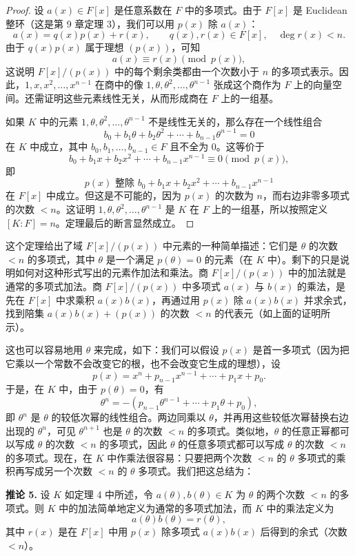 \begin{proof}
	设 $a(x)\in F[x]$ 是任意系数在 $F$ 中的多项式。由于 $F[x]$ 是 Euclidean 整环（这是第 9 章定理 3），我们可以用 $p(x)$ 除 $a(x)$：
	\[
	a(x)=q(x)p(x)+r(x),\qquad q(x),r(x)\in F[x],\quad \deg r(x)<n.
	\]
	由于 $q(x)p(x)$ 属于理想 $(p(x))$，可知
	\[
	a(x)\equiv r(x)\pmod{p(x)},
	\]
	这说明 $F[x]/(p(x))$ 中的每个剩余类都由一个次数小于 $n$ 的多项式表示。因此，$1,x,x^2,\ldots,x^{n-1}$ 在商中的像 $1,\theta,\theta^2,\ldots,\theta^{n-1}$ 张成这个商作为 $F$ 上的向量空间。还需证明这些元素线性无关，从而形成商在 $F$ 上的一组基。
	
	如果 $K$ 中的元素 $1,\theta,\theta^2,\ldots,\theta^{n-1}$ 不是线性无关的，那么存在一个线性组合
	\[
	b_0+b_1\theta+b_2\theta^2+\cdots+b_{n-1}\theta^{n-1}=0
	\]
	在 $K$ 中成立，其中 $b_0,b_1,\ldots,b_{n-1}\in F$ 且不全为 $0$。这等价于
	\[
	b_0+b_1x+b_2x^2+\cdots+b_{n-1}x^{n-1}\equiv 0\pmod{p(x)},
	\]
	即
	\[
	p(x)\text{ 整除 } b_0+b_1x+b_2x^2+\cdots+b_{n-1}x^{n-1}
	\]
	在 $F[x]$ 中成立。但这是不可能的，因为 $p(x)$ 的次数为 $n$，而右边非零多项式的次数 $<n$。这证明 $1,\theta,\theta^2,\ldots,\theta^{n-1}$ 是 $K$ 在 $F$ 上的一组基，所以按照定义 $[K:F]=n$。定理最后的断言显然成立。
\end{proof}

这个定理给出了域 $F[x]/(p(x))$ 中元素的一种简单描述：它们是 $\theta$ 的次数 $<n$ 的多项式，其中 $\theta$ 是一个满足 $p(\theta)=0$ 的元素（在 $K$ 中）。剩下的只是说明如何对这种形式写出的元素作加法和乘法。商 $F[x]/(p(x))$ 中的加法就是通常的多项式加法。商 $F[x]/(p(x))$ 中多项式 $a(x)$ 与 $b(x)$ 的乘法，是先在 $F[x]$ 中求乘积 $a(x)b(x)$，再通过用 $p(x)$ 除 $a(x)b(x)$ 并求余式，找到陪集 $a(x)b(x)+(p(x))$ 的次数 $<n$ 的代表元（如上面的证明所示）。

这也可以容易地用 $\theta$ 来完成，如下：我们可以假设 $p(x)$ 是首一多项式（因为把它乘以一个常数不会改变它的根，也不会改变它生成的理想），设
\[
p(x)=x^n+p_{n-1}x^{n-1}+\cdots+p_1x+p_0.
\]
于是，在 $K$ 中，由于 $p(\theta)=0$，有
\[
\theta^n=-(p_{n-1}\theta^{n-1}+\cdots+p_1\theta+p_0),
\]
即 $\theta^n$ 是 $\theta$ 的较低次幂的线性组合。两边同乘以 $\theta$，并再用这些较低次幂替换右边出现的 $\theta^n$，可见 $\theta^{n+1}$ 也是 $\theta$ 的次数 $<n$ 的多项式。类似地，$\theta$ 的任意正幂都可以写成 $\theta$ 的次数 $<n$ 的多项式，因此 $\theta$ 的任意多项式都可以写成 $\theta$ 的次数 $<n$ 的多项式。现在，在 $K$ 中作乘法很容易：只要把两个次数 $<n$ 的 $\theta$ 多项式的乘积再写成另一个次数 $<n$ 的 $\theta$ 多项式。我们把这总结为：

\noindent\textbf{推论 5.} 设 $K$ 如定理 4 中所述，令 $a(\theta),b(\theta)\in K$ 为 $\theta$ 的两个次数 $<n$ 的多项式。则 $K$ 中的加法简单地定义为通常的多项式加法，而 $K$ 中的乘法定义为
\[
a(\theta)b(\theta)=r(\theta),
\]
其中 $r(x)$ 是在 $F[x]$ 中用 $p(x)$ 除多项式 $a(x)b(x)$ 后得到的余式（次数 $<n$）。

